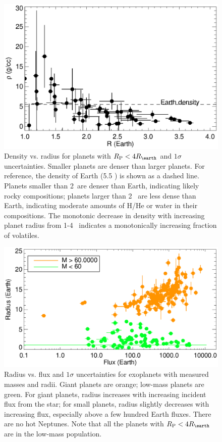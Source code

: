 \documentclass[11pt]{aastex}
\newcommand{\rspecial}{4 \rearth}
\begin{document}
\begin{figure}[htbp] %
   \centering
    \includegraphics[width=6in]{rhor_4.eps} 
   \caption{Density vs. radius for planets with $\rpl < \rspecial $ and $1\sigma$ uncertainties.  Smaller planets are denser than larger planets.  For reference, the density of Earth (5.5 \gcc) is shown as a dashed line.  Planets smaller than 2\rearth\ are denser than Earth, indicating likely rocky compositions; planets larger than 2 \rearth\ are less dense than Earth, indicating moderate amounts of H/He or water in their compositions.  The monotonic decrease in density with increasing planet radius from 1-4 \rearth\ indicates a monotonically increasing fraction of volatiles.}
   \label{fig:rhor}
\end{figure}


\begin{figure}[htbp] %
   \centering
      \includegraphics[width=6in]{flux_dependence.eps} 
   \caption{Radius vs. flux and $1\sigma$ uncertainties for exoplanets with measured masses and radii.  Giant planets are orange; low-mass planets are green.  For giant planets, radius increases with increasing incident flux from the star; for small planets, radius slightly decreases with increasing flux, especially above a few hundred Earth fluxes.  There are no hot Neptunes.  Note that all the planets with $\rpl < 4 \rearth$ are in the low-mass population.}
   \label{fig:flux_radius}
\end{figure}
\end{document}
